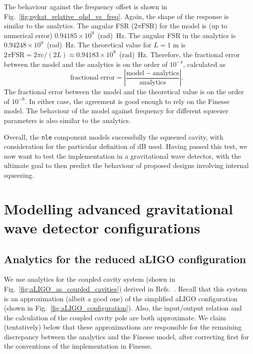 \documentclass[aps,pra,superscriptaddress,reprint,nofootinbib]{revtex4-1}
\newcommand{\abs}[1]{\left\lvert #1 \right\rvert}
\newcommand{\code}[1]{\texttt{#1}}
\begin{document}
The behaviour against the frequency offset is shown in Fig.~\ref{fig:pykat_relative_qhd_vs_freq}. Again, the shape of the response is similar to the analytics.
The angular FSR ($2 \pi \mathrm{FSR}$) for the model is (up to numerical error) $0.94185 \times 10^9$~(rad)~Hz.
The angular FSR in the analytics is $0.94248 \times 10^9$~(rad)~Hz.
The theoretical value for $L = 1$ m is $2 \pi \mathrm{FSR} = 2 \pi c/(2 L) \approx 0.94183 \times 10^9$~(rad)~Hz.
Therefore, the fractional error between the model and the analytics is on the order of $10^{-4}$, calculated as
\begin{equation}
\mathrm{fractional\; error} = \abs{\frac{\mathrm{model} - \mathrm{analytics}}{\mathrm{analytics}}}.
\end{equation}
The fractional error between the model and the theoretical value is on the order of $10^{-6}$. In either case, the agreement is good enough to rely on the Finesse model.
The behaviour of the model against frequency for different squeezer parameters is also similar to the analytics.


Overall, the \code{nle} component models successfully the squeezed cavity, with consideration for the particular definition of dB used. Having passed this test, we now want to test the implementation in a gravitational wave detector, with the ultimate goal to then predict the behaviour of proposed designs involving internal squeezing.


\section{Modelling advanced gravitational wave detector configurations}
\label{sec:aLIGOcomparison}

\subsection{Analytics for the reduced aLIGO configuration}

We use analytics for the coupled cavity system (shown in Fig.~\ref{fig:aLIGO_as_coupled_cavities}) derived in Refs.~\cite{Korobko_2019,SOMIYA2016521}. Recall that this system is an approximation (albeit a good one) of the simplified aLIGO configuration (shown in Fig.~\ref{fig:aLIGO_configuration}). Also, the input/output relation and the calculation of the coupled cavity pole are both approximate. We claim (tentatively) below that these approximations are responsible for the remaining discrepancy between the analytics and the Finesse model, after correcting first for the conventions of the implementation in Finesse.
\end{document}
